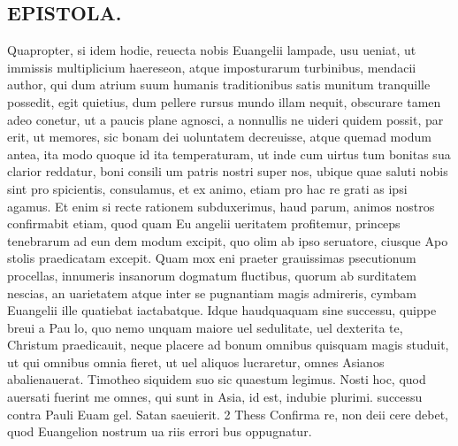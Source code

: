 \documentclass{article}
\begin{document}
\begin{pages}
\section*{EPISTOLA. }\pstart Quapropter, si idem hodie, reuecta nobis Euangelii lampade, usu ueniat, ut immissis multiplicium haereseon, atque imposturarum turbinibus, mendacii author, qui dum atrium suum humanis traditionibus satis munitum tranquille possedit, egit quietius, dum pellere rursus mundo illam nequit, obscurare tamen adeo conetur, ut a paucis plane agnosci, a nonnullis ne uideri quidem possit, par erit, ut memores, sic bonam dei uoluntatem decreuisse, atque quemad modum antea, ita modo quoque id ita temperaturam, ut inde cum uirtus tum bonitas sua clarior reddatur, boni consili um patris nostri super nos, ubique quae saluti nobis sint pro spicientis, consulamus, et ex animo, etiam pro hac re grati as ipsi agamus. Et enim si recte rationem subduxerimus, haud parum, animos nostros confirmabit etiam, quod quam Eu angelii ueritatem profitemur, princeps tenebrarum ad eun dem modum excipit, quo olim ab ipso seruatore, ciusque Apo stolis praedicatam excepit.  \pend\pstart Quam mox eni praeter grauissimas psecutionum procellas, innumeris insanorum dogmatum fluctibus, quorum ab surditatem nescias, an uarietatem atque inter se pugnantiam magis admireris, cymbam Euangelii ille quatiebat iactabatque. Idque haudquaquam sine successu, quippe breui a Pau lo, quo nemo unquam maiore uel sedulitate, uel dexterita te, Christum praedicauit, neque placere ad bonum omnibus quisquam magis studuit, ut qui omnibus   omnia fieret, ut uel aliquos lucraretur, omnes Asianos abalienauerat. Timotheo siquidem suo sic quaestum legimus. Nosti hoc, quod auersati fuerint me omnes, qui sunt in Asia, id est, indubie plurimi.   \pendQuo successu contra Pauli Euam gel. Satan saeuierit.  2 Thess Confirma re, non deii cere debet, quod Euangelion nostrum ua riis errori bus oppugnatur. 

\end{pages}
\end{document}
